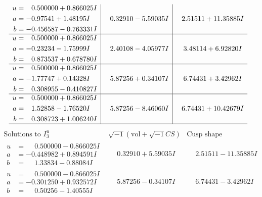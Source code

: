 \documentclass[1p]{elsarticle_modified}
\theoremstyle{definition}
\newcommand{\I}{\sqrt{-1}}
\begin{document}
$$\begin{array}{c|c|c}
\begin{aligned}
u &= \phantom{-}0.500000 + 0.866025 I \\
a &= -0.97541 + 1.48195 I \\
b &= -0.456587 - 0.763331 I\end{aligned}
 & \phantom{-}0.32910 - 5.59035 I & \phantom{-}2.51511 + 11.35885 I \\ \hline\begin{aligned}
u &= \phantom{-}0.500000 + 0.866025 I \\
a &= -0.23234 - 1.75999 I \\
b &= \phantom{-}0.873537 + 0.678780 I\end{aligned}
 & \phantom{-}2.40108 - 4.05977 I & \phantom{-}3.48114 + 6.92820 I \\ \hline\begin{aligned}
u &= \phantom{-}0.500000 + 0.866025 I \\
a &= -1.77747 + 0.14328 I \\
b &= \phantom{-}0.308955 - 0.410827 I\end{aligned}
 & \phantom{-}5.87256 + 0.34107 I & \phantom{-}6.74431 + 3.42962 I \\ \hline\begin{aligned}
u &= \phantom{-}0.500000 + 0.866025 I \\
a &= \phantom{-}1.52858 - 1.76520 I \\
b &= \phantom{-}0.308723 + 1.006240 I\end{aligned}
 & \phantom{-}5.87256 - 8.46060 I & \phantom{-}6.74431 + 10.42679 I\\
 \hline 
 \end{array}$$\newpage$$\begin{array}{c|c|c}  
\text{Solutions to }I^u_{3}& \I (\text{vol} + \sqrt{-1}CS) & \text{Cusp shape}\\
 \hline 
\begin{aligned}
u &= \phantom{-}0.500000 - 0.866025 I \\
a &= -0.448982 + 0.894591 I \\
b &= \phantom{-}1.33834 - 0.88084 I\end{aligned}
 & \phantom{-}0.32910 + 5.59035 I & \phantom{-}2.51511 - 11.35885 I \\ \hline\begin{aligned}
u &= \phantom{-}0.500000 - 0.866025 I \\
a &= -0.301250 + 0.932572 I \\
b &= \phantom{-}0.50256 - 1.40555 I\end{aligned}
 & \phantom{-}5.87256 - 0.34107 I & \phantom{-}6.74431 - 3.42962 I \\ \hline\begin{aligned}

\end{aligned}
\end{array}$$
\end{document}
